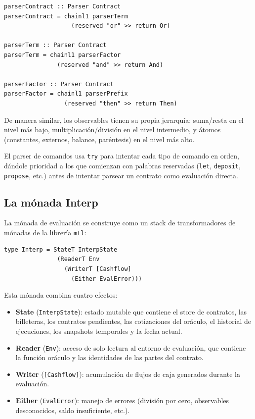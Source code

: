 \documentclass[a4paper, 12pt]{article}
\begin{document}
\begin{lstlisting}[caption={Jerarquía de precedencias en el parser}]
parserContract :: Parser Contract
parserContract = chainl1 parserTerm
                   (reserved "or" >> return Or)

parserTerm :: Parser Contract
parserTerm = chainl1 parserFactor
               (reserved "and" >> return And)

parserFactor :: Parser Contract
parserFactor = chainl1 parserPrefix
                 (reserved "then" >> return Then)
\end{lstlisting}

De manera similar, los observables tienen su propia jerarquía: suma/resta en el nivel más bajo, multiplicación/división en el nivel intermedio, y átomos (constantes, externos, balance, paréntesis) en el nivel más alto.

El parser de comandos usa \texttt{try} para intentar cada tipo de comando en orden, dándole prioridad a los que comienzan con palabras reservadas (\texttt{let}, \texttt{deposit}, \texttt{propose}, etc.) antes de intentar parsear un contrato como evaluación directa.

\subsection{La mónada Interp}

La mónada de evaluación se construye como un stack de transformadores de mónadas de la librería \texttt{mtl}:

\begin{lstlisting}[caption={Definición de la mónada Interp (Monads.hs)}]
type Interp = StateT InterpState
               (ReaderT Env
                 (WriterT [Cashflow]
                   (Either EvalError)))
\end{lstlisting}

Esta mónada combina cuatro efectos:

\begin{itemize}
    \item \textbf{State} (\texttt{InterpState}): estado mutable que contiene el store de contratos, las billeteras, los contratos pendientes, las cotizaciones del oráculo, el historial de ejecuciones, los snapshots temporales y la fecha actual.
    \item \textbf{Reader} (\texttt{Env}): acceso de solo lectura al entorno de evaluación, que contiene la función oráculo y las identidades de las partes del contrato.
    \item \textbf{Writer} (\texttt{[Cashflow]}): acumulación de flujos de caja generados durante la evaluación.
    \item \textbf{Either} (\texttt{EvalError}): manejo de errores (división por cero, observables desconocidos, saldo insuficiente, etc.).
\end{itemize}
\end{document}
